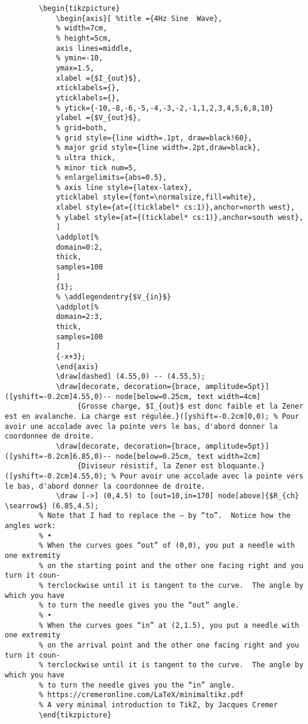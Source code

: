 \documentclass[a4paper,12pt,dvipsnames]{article}
\begin{document}
\begin{verbatim}
		\begin{tikzpicture}
			\begin{axis}[ %title ={4Hz Sine  Wave},
			% width=7cm,
			% height=5cm,
			axis lines=middle,
			% ymin=-10,
			ymax=1.5,
			xlabel ={$I_{out}$},
			xticklabels={},
			yticklabels={},
			% ytick={-10,-8,-6,-5,-4,-3,-2,-1,1,2,3,4,5,6,8,10}
			ylabel ={$V_{out}$},
		    % grid=both,
		    % grid style={line width=.1pt, draw=black!60},
		    % major grid style={line width=.2pt,draw=black},
		    % ultra thick,
		    % minor tick num=5,
		    % enlargelimits={abs=0.5},
		    % axis line style={latex-latex},
		    yticklabel style={font=\normalsize,fill=white},
		    xlabel style={at={(ticklabel* cs:1)},anchor=north west},
		    % ylabel style={at={(ticklabel* cs:1)},anchor=south west},
			]
			\addplot[%
			domain=0:2,
			thick,
			samples=100
			]
			{1};
			% \addlegendentry{$V_{in}$}
			\addplot[%
			domain=2:3,
			thick,
			samples=100
			]
			{-x+3};
			\end{axis}
			\draw[dashed] (4.55,0) -- (4.55,5);
			\draw[decorate, decoration={brace, amplitude=5pt}] ([yshift=-0.2cm]4.55,0)-- node[below=0.25cm, text width=4cm]
		         {Grosse charge, $I_{out}$ est donc faible et la Zener est en avalanche. La charge est régulée.}([yshift=-0.2cm]0,0); % Pour avoir une accolade avec la pointe vers le bas, d'abord donner la coordonnee de droite.
			\draw[decorate, decoration={brace, amplitude=5pt}] ([yshift=-0.2cm]6.85,0)-- node[below=0.25cm, text width=2cm]
		         {Diviseur résistif, la Zener est bloquante.}([yshift=-0.2cm]4.55,0); % Pour avoir une accolade avec la pointe vers le bas, d'abord donner la coordonnee de droite.
		    \draw [->] (0,4.5) to [out=10,in=170] node[above]{$R_{ch} \searrow$} (6.85,4.5);
		% Note that I had to replace the – by “to”.  Notice how the angles work:
		% •
		% When the curves goes “out” of (0,0), you put a needle with one extremity
		% on the starting point and the other one facing right and you turn it coun-
		% terclockwise until it is tangent to the curve.  The angle by which you have
		% to turn the needle gives you the “out” angle.
		% •
		% When the curves goes “in” at (2,1.5), you put a needle with one extremity
		% on the arrival point and the other one facing right and you turn it coun-
		% terclockwise until it is tangent to the curve.  The angle by which you have
		% to turn the needle gives you the “in” angle.
		% https://cremeronline.com/LaTeX/minimaltikz.pdf
		% A very minimal introduction to TikZ, by Jacques Cremer
		\end{tikzpicture}
\end{verbatim}
\end{document}
